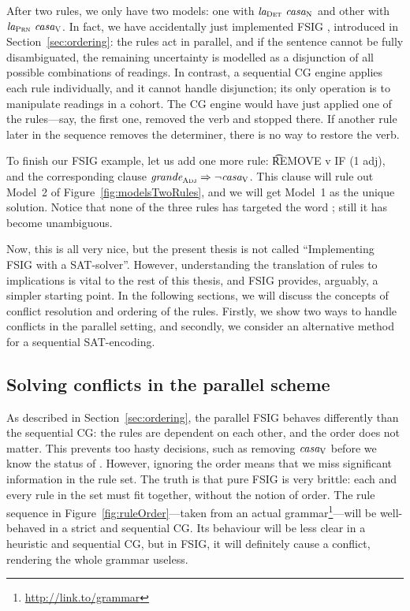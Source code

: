After two rules, we only have two models: one with $\text{\em la}_{\text{\sc Det}} \ \text{\em casa}_{\text{\sc N}}$ and other with $\text{\em la}_{\text{\sc Prn}} \ \text{\em casa}_{\text{\sc V}}$. 
In fact, we have accidentally just implemented FSIG \cite{koskenniemi90}, introduced in Section~\ref{sec:ordering}: the rules act in parallel, and if the sentence cannot be fully disambiguated, the remaining uncertainty is modelled as a disjunction of all possible combinations of readings.
In contrast, a sequential CG engine applies each rule individually, and it cannot handle disjunction; its only operation is to manipulate readings in a cohort.
The CG engine would have just applied one of the rules---say, the first one, removed the verb and stopped there. If another rule later in the sequence removes the determiner, there is no way to restore the verb. 

To finish our FSIG example, let us add one more rule: \t{REMOVE v IF (1 adj)}, and the corresponding clause $\text{\em grande}_{\text{\sc Adj}} \Rightarrow \neg \text{\em casa}_{\text{\sc V}}$. This clause will rule out Model~2 of Figure~\ref{fig:modelsTwoRules}, and we will get Model~1 as the unique solution. 
Notice that none of the three rules has targeted the word \la{}; still it has become unambiguous. 

Now, this is all very nice, but the present thesis is not called ``Implementing FSIG with a SAT-solver''. 
However, understanding the translation of rules to implications is vital to the rest of this thesis, and FSIG provides, arguably, a simpler starting point.
In the following sections, we will discuss the concepts of conflict resolution and ordering of the rules. 
Firstly, we show two ways to handle conflicts in the parallel setting, 
and secondly, we consider an alternative method for a sequential SAT-encoding.




\subsection{Solving conflicts in the parallel scheme}
\label{sec:parallelScheme}

As described in Section~\ref{sec:ordering}, the parallel FSIG behaves differently than the 
sequential CG: the rules are dependent on each other, and the order does not matter.
This prevents too hasty decisions, such as removing $\text{\em casa}_{\text{\sc V}}$ before we know the status of \la{}. 
However, ignoring the order means that we miss significant information in the rule set. 
The truth is that pure FSIG is very brittle: each and every rule in the set must fit together, without the notion of order. The rule sequence in Figure~\ref{fig:ruleOrder}---taken from an actual grammar\footnote{\url{http://link.to/grammar}}---will be well-behaved in a strict and sequential CG. Its behaviour will be less clear in a heuristic and sequential CG, but in FSIG, it will definitely cause a conflict, rendering the whole grammar useless.

